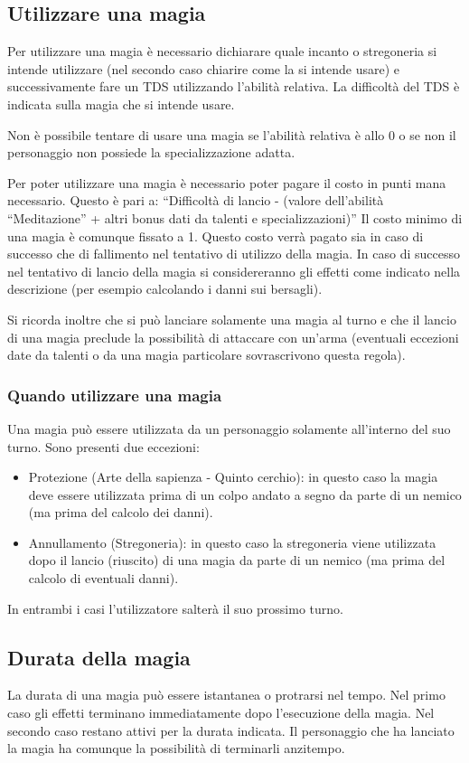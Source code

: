 \documentclass[../manuale_main.tex]{subfiles}
\begin{document}
\subsection{Utilizzare una magia}

Per utilizzare una magia è necessario dichiarare quale incanto o stregoneria si intende utilizzare (nel secondo caso chiarire come la si intende usare) e successivamente fare un TDS utilizzando l'abilità relativa. La difficoltà del TDS è indicata sulla magia che si intende usare.

Non è possibile tentare di usare una magia se l'abilità relativa è allo 0 o se non il personaggio non possiede la specializzazione adatta.

Per poter utilizzare una magia è necessario poter pagare il costo in punti mana necessario.
Questo è pari a: “Difficoltà di lancio - (valore dell'abilità “Meditazione” + altri bonus dati da talenti e specializzazioni)”
Il costo minimo di una magia è comunque fissato a 1.
Questo costo verrà pagato sia in caso di successo che di fallimento nel tentativo di utilizzo della magia.
In caso di successo nel tentativo di lancio della magia si considereranno gli effetti come indicato nella descrizione (per esempio calcolando i danni sui bersagli).

Si ricorda inoltre che si può lanciare solamente una magia al turno e che il lancio di una magia preclude la possibilità di attaccare con un'arma (eventuali eccezioni date da talenti o da una magia particolare sovrascrivono questa regola).

\subsubsection{Quando utilizzare una magia}
Una magia può essere utilizzata da un personaggio solamente all'interno del suo turno.
Sono presenti due eccezioni:
\begin{itemize}
\item Protezione (Arte della sapienza - Quinto cerchio): in questo caso la magia deve essere utilizzata prima di un colpo andato a segno da parte di un nemico (ma prima del calcolo dei danni).
\item Annullamento (Stregoneria): in questo caso la stregoneria viene utilizzata dopo il lancio (riuscito) di una magia da parte di un nemico (ma prima del calcolo di eventuali danni).
\end{itemize}
In entrambi i casi l'utilizzatore salterà il suo prossimo turno.

\subsection{Durata della magia}
La durata di una magia può essere istantanea o protrarsi nel tempo.
Nel primo caso gli effetti terminano immediatamente dopo l'esecuzione della magia.
Nel secondo caso restano attivi per la durata indicata. Il personaggio che ha lanciato la magia ha comunque la possibilità di terminarli anzitempo.
\end{document}
